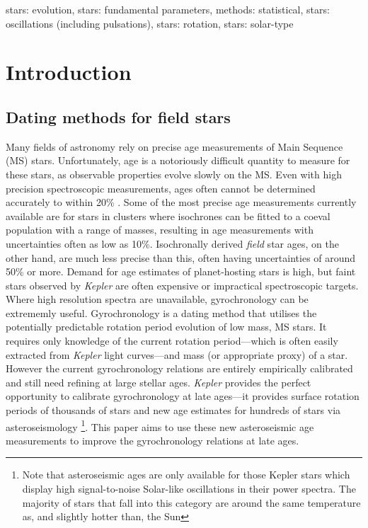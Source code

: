 \documentclass[useAMS, usenatbib]{mn2e}
\begin{document}
\begin{keywords}
stars: evolution, stars: fundamental parameters, methods: statistical, stars:
oscillations (including pulsations), stars: rotation, stars: solar-type
\end{keywords}

\section{Introduction}
\label{intro}
\subsection{Dating methods for field stars}

Many fields of astronomy rely on precise age measurements of Main Sequence
(MS) stars.
Unfortunately, age is a notoriously difficult quantity to measure for these
stars, as observable properties evolve slowly on the MS.
Even with high precision spectroscopic measurements, ages often cannot be
determined accurately to within 20\% \citep{Soderblom2010}.
Some of the most precise age measurements currently available are for stars in
clusters where isochrones can be fitted to a coeval population with a range of
masses, resulting in age measurements with uncertainties often as low as 10\%.
Isochronally derived {\it field} star ages, on the other hand, are much less
precise than this, often having uncertainties of around 50\% or more.
Demand for age estimates of planet-hosting stars is high, but faint stars
observed by {\it Kepler} are often expensive or impractical spectroscopic
targets.
Where high resolution spectra are unavailable, gyrochronology can be
extrememly useful.
Gyrochronology is a dating method that utilises the potentially
predictable rotation period evolution of low mass, MS stars.
It requires only knowledge of the current rotation period---which is often
easily extracted from {\it Kepler} light curves---and mass (or appropriate
proxy) of a star.
However the current gyrochronology relations are entirely empirically
calibrated and still need refining at large stellar ages.
{\it Kepler} provides the perfect opportunity to calibrate gyrochronology at
late ages---it provides surface rotation periods of thousands of stars and new
age estimates for hundreds of stars via asteroseismology \footnote{Note that
asteroseismic ages are only available for those Kepler stars which display
high signal-to-noise Solar-like oscillations in their power
spectra.
The majority of stars that fall into this category are around the same
temperature as, and slightly hotter than, the Sun}.  %
This paper aims to use these new asteroseismic age measurements to improve the
gyrochronology relations at late ages.
\end{document}
